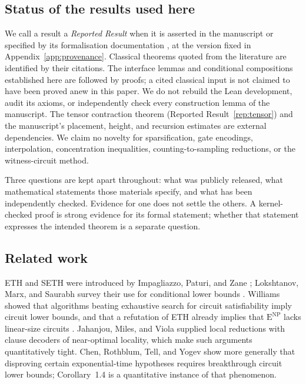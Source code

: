 \documentclass[11pt,reqno]{amsart}
\numberwithin{equation}{section}
\theoremstyle{plain}
\theoremstyle{definition}
\theoremstyle{remark}
\newcommand{\ENP}{\mathrm E^{\mathrm{NP}}}
\begin{document}
\subsection{Status of the results used here}\label{sec:status}
We call a result a \emph{Reported Result} when it is asserted in the
manuscript \cite{OpenAIPaper} or specified by its formalisation documentation
\cite{OpenAIScope,OpenAIComparator}, at the version fixed in
Appendix~\ref{app:provenance}. Classical theorems quoted from the literature are identified by their
citations. The interface lemmas and conditional compositions established
here are followed by proofs; a cited classical input is not claimed to
have been proved anew in this paper.
We do not rebuild the Lean development, audit its axioms, or independently
check every construction lemma of the manuscript. The tensor contraction
theorem (Reported Result~\ref{rep:tensor}) and the manuscript's placement,
height, and recursion estimates are external dependencies. We claim no
novelty for sparsification, gate encodings, interpolation, concentration
inequalities, counting-to-sampling reductions, or the witness-circuit method.

Three questions are kept apart throughout: what was publicly released, what
mathematical statements those materials specify, and what has been
independently checked. Evidence for one does not settle the others. A
kernel-checked proof is strong evidence for its formal statement; whether
that statement expresses the intended theorem is a separate question.

\subsection{Related work}\label{sec:related}
ETH and SETH were introduced by Impagliazzo, Paturi, and Zane
\cite{IP,IPZ}; Lokshtanov, Marx, and Saurabh survey their use for
conditional lower bounds \cite{LMS}. Williams \cite{Williams} showed that
algorithms beating exhaustive search for circuit satisfiability imply
circuit lower bounds, and that a refutation of ETH already implies that
$\ENP$ lacks linear-size circuits \cite[Theorem~6.1]{Williams}. Jahanjou,
Miles, and Viola \cite{JMV} supplied local reductions with clause decoders
of near-optimal locality, which make such arguments quantitatively tight.
Chen, Rothblum, Tell, and Yogev \cite{CRTY} show more generally that
disproving certain exponential-time hypotheses requires breakthrough
circuit lower bounds; Corollary~1.4 is a quantitative instance of that
phenomenon.
\end{document}
